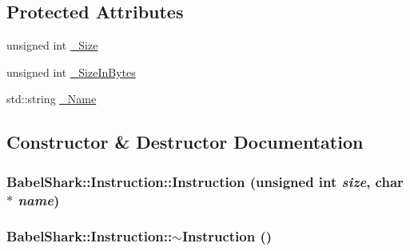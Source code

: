 \subsection*{Protected Attributes}
\begin{CompactItemize}
\item 
unsigned int \hyperlink{class_babel_shark_1_1_instruction_fc2e2c16ce0c0430c1afa0ea0a420117}{\_\-Size}
\item 
unsigned int \hyperlink{class_babel_shark_1_1_instruction_7cdc8ffade0294ee675c62d13cd01adb}{\_\-SizeInBytes}
\item 
std::string \hyperlink{class_babel_shark_1_1_instruction_5633af541e0014aa9797279b9ce387db}{\_\-Name}
\end{CompactItemize}


\subsection{Constructor \& Destructor Documentation}
\hypertarget{class_babel_shark_1_1_instruction_db56af133f39de0e46b4ff08b17de68d}{
\subsubsection[{Instruction}]{\setlength{\rightskip}{0pt plus 5cm}BabelShark::Instruction::Instruction (unsigned int {\em size}, \/  char $\ast$ {\em name})}}
\label{class_babel_shark_1_1_instruction_db56af133f39de0e46b4ff08b17de68d}


\hypertarget{class_babel_shark_1_1_instruction_e3894f3dfd5fbde200f94a90dfd64791}{
\subsubsection[{$\sim$Instruction}]{\setlength{\rightskip}{0pt plus 5cm}BabelShark::Instruction::$\sim$Instruction ()}}
\label{class_babel_shark_1_1_instruction_e3894f3dfd5fbde200f94a90dfd64791}





